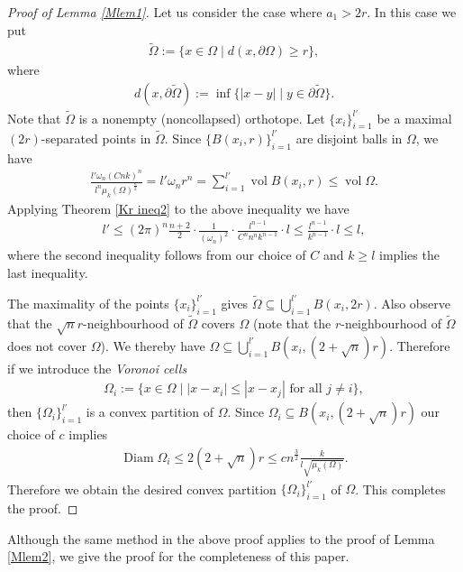 \documentclass[12pt]{amsart}
\theoremstyle{plain}
\theoremstyle{remark}
\newcommand{\vol}{\operatorname{vol}}
\newcommand{\diam}{\operatorname{Diam}}
\begin{document}
\begin{proof}[Proof of Lemma \ref{Mlem1}]
    Let us consider the case where $a_1>2r$. In this case we put 
    \begin{align*}
        \widetilde{\Omega}:=\{x\in \Omega \mid d(x,\partial \Omega)\geq r\},
    \end{align*}where 
    \begin{align*}
        d(x,\partial \widetilde{\Omega}):=\inf \{|x-y| \mid y\in \partial \widetilde{\Omega}\}.
    \end{align*}
    Note that $\widetilde{\Omega}$ is a nonempty (noncollapsed) orthotope. Let $\{x_i\}_{i=1}^{l'}$ be a maximal $(2r)$-separated points in $\widetilde{\Omega}$. Since $\{B(x_i,r)\}_{i=1}^{l'}$ are disjoint balls in $\Omega$, we have
    \begin{align*}
       \frac{l'\omega_n(Cnk)^n}{l^n\mu_k(\Omega)^{\frac{n}{2}}}= l'\omega_n r^n =\sum_{i=1}^{l'} \vol B(x_i,r)\leq \vol \Omega.
    \end{align*}
    Applying Theorem \ref{Kr ineq2} to the above inequality we have
    \begin{align*}
        l'\leq (2\pi)^n\frac{n+2}{2}\cdot \frac{1}{(\omega_n)^2}\cdot \frac{l^{n-1}}{C^n n^nk^{n-1}}\cdot l\leq \frac{l^{n-1}}{k^{n-1}}\cdot l \leq l,
    \end{align*}where the second inequality follows from our choice of $C$ and $k\geq l$ implies the last inequality. 
   

    The maximality of the points $\{x_i\}_{i=1}^{l'}$ gives $\widetilde{\Omega}\subseteq \bigcup_{i=1}^{l'}B(x_i,2r)$. Also observe that the $\sqrt{n}r$-neighbourhood of $\widetilde{\Omega}$ covers $\Omega$ (note that the $r$-neighbourhood of $\widetilde{\Omega}$ does not cover $\Omega$). We thereby have $\Omega\subseteq \bigcup_{i=1}^{l'}B(x_i,(2+\sqrt{n})r)$. Therefore if we introduce the \emph{Voronoi cells}
    \begin{align*}
        \Omega_i:=\{x\in \Omega \mid |x-x_i|\leq |x-x_j| \text{ for all }j\neq i\},
    \end{align*}then $\{\Omega_i\}_{i=1}^{l'}$ is a convex partition of $\Omega$. Since $\Omega_i\subseteq B(x_i,(2+\sqrt{n})r)$ our choice of $c$ implies
    \begin{align*}
        \diam \Omega_i\leq 2(2+\sqrt{n})r\leq c n^{\frac{3}{2}}\frac{k}{l\sqrt{\mu_k(\Omega)}}.
    \end{align*}Therefore we obtain the desired convex partition $\{\Omega_i\}_{i=1}^{l'}$ of $\Omega$. This completes the proof.
\end{proof}
Although the same method in the above proof applies to the proof of Lemma \ref{Mlem2}, we give the proof for the completeness of this paper. 
\end{document}
